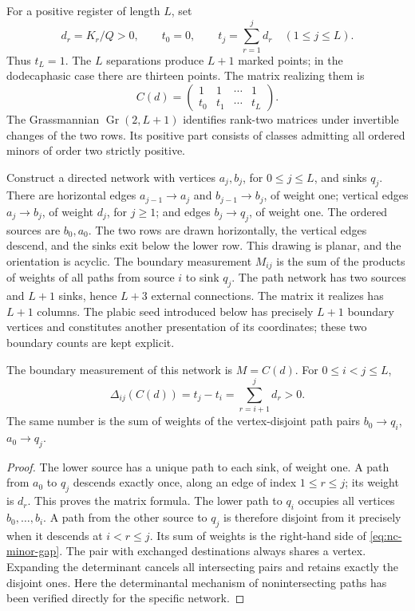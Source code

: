 For a positive register of length \(L\), set
\[
 d_r=K_r/Q>0,\qquad t_0=0,\qquad
 t_j=\sum_{r=1}^jd_r\quad(1\le j\le L).
\]
Thus \(t_L=1\). The \(L\) separations produce \(L+1\) marked
points; in the dodecaphasic case there are thirteen points.
The matrix realizing them is
\begin{equation}
 C(d)=\begin{pmatrix}1&1&\cdots&1\\t_0&t_1&\cdots&t_L\end{pmatrix}.
 \label{eq:nc-path-matrix}
\end{equation}
The Grassmannian \(\operatorname{Gr}(2,L+1)\) identifies rank-two
matrices under invertible changes of the two rows. Its positive part
consists of classes admitting all ordered minors of order two strictly
positive.

Construct a directed network with vertices \(a_j,b_j\), for
\(0\le j\le L\), and sinks \(q_j\). There are horizontal edges
\(a_{j-1}\to a_j\) and \(b_{j-1}\to b_j\), of weight one;
vertical edges \(a_j\to b_j\), of weight \(d_j\), for \(j\ge1\);
and edges \(b_j\to q_j\), of weight one. The ordered sources are
\(b_0,a_0\). The two rows are drawn horizontally, the vertical edges
descend, and the sinks exit below the lower row. This drawing is planar,
and the orientation is acyclic. The boundary measurement \(M_{ij}\)
is the sum of the products of weights of all paths from source \(i\)
to sink \(q_j\).
The path network has two sources and \(L+1\) sinks, hence \(L+3\)
external connections. The matrix it realizes has \(L+1\) columns.
The plabic seed introduced below has precisely \(L+1\) boundary
vertices and constitutes another presentation of its coordinates;
these two boundary counts are kept explicit.

\begin{theorem}
\label{thm:nc-network}
The boundary measurement of this network is \(M=C(d)\).
For \(0\le i<j\le L\),
\begin{equation}
 \Delta_{ij}(C(d))=t_j-t_i=\sum_{r=i+1}^{j}d_r>0.
 \label{eq:nc-minor-gap}
\end{equation}
The same number is the sum of weights of the vertex-disjoint path
pairs \(b_0\to q_i\), \(a_0\to q_j\).
\end{theorem}
\begin{proof}
The lower source has a unique path to each sink, of weight one.
A path from \(a_0\) to \(q_j\) descends exactly once, along an
edge of index \(1\le r\le j\); its weight is \(d_r\). This
proves the matrix formula. The lower path to \(q_i\) occupies all
vertices \(b_0,\ldots,b_i\). A path from the other source to
\(q_j\) is therefore disjoint from it precisely when it descends
at \(i<r\le j\). Its sum of weights is the right-hand side of
\eqref{eq:nc-minor-gap}. The pair with exchanged destinations always
shares a vertex. Expanding the determinant cancels all intersecting
pairs and retains exactly the disjoint ones. Here the determinantal
mechanism of nonintersecting paths has been verified directly for the
specific network.
\end{proof}

